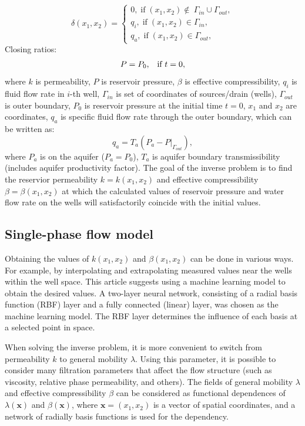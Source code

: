 \documentclass[
11pt,%
tightenlines,%
twoside,%
onecolumn,%
nofloats,%
nobibnotes,%
nofootinbib,%
superscriptaddress,%
noshowpacs,%
centertags]%
{revtex4}
\begin{document}
\begin{equation} \label{bc}
	\delta(x_1,x_2)  = \left\{\begin{array}{crl}
		0, \;\mbox{if}\;(x_1,x_2) \notin\ \Gamma_{in}\cup\Gamma_{out},\\
		q_{i}, \;\mbox{if}\;(x_1,x_2) \in \Gamma_{in},\\
		q_{a}, \;\mbox{if}\;(x_1,x_2) \in \Gamma_{out},
	\end{array}\right. 
\end{equation}
Closing ratios:
\begin{equation} \label{kr}
	P = P_0\mbox{,\quad \mbox{if} $t=0$},
\end{equation}
where $k$ is permeability, $P$ is reservoir pressure, $\beta$ is
effective compressibility, $q_i$ is fluid flow rate in $i$-th well, $\Gamma_{in}$
is set of coordinates of sources/drain (wells), $\Gamma_{out}$ is
outer boundary, $P_0$ is reservoir pressure at the initial time $t=0$, $x_1$ and $x_2$ are coordinates, $q_{a}$ is specific fluid flow rate through the outer boundary, which can be written as:
\begin{equation*} \label{qaq}
	q_{a} = T_{a}(P_{a} - P|_{\Gamma_{out}}),
\end{equation*}
where $P_a$ is on the aquifer ($P_a = P_0$), $T_a$ is
aquifer boundary transmissibility (includes aquifer productivity factor). The goal of the inverse problem is to find the reservior permeability $k = k(x_1,x_2)$ and effective compressibility $\beta = \beta(x_1,x_2)$ at which the calculated values of reservoir pressure and water flow rate on the wells will satisfactorily coincide with the initial values.

\subsection{Single-phase flow model}

Obtaining the values of $k(x_1,x_2)$ and $\beta(x_1,x_2)$ can be done in various ways. For example, by interpolating and extrapolating measured values near the wells within the well space. This article suggests using a machine learning model to obtain the desired values. A two-layer neural network, consisting of a radial basis function (RBF) layer and a fully connected (linear) layer, was chosen as the machine learning model. The RBF layer determines the influence of each basis at a selected point in space.

When solving the inverse problem, it is more convenient to switch from permeability $k$ to general mobility $\lambda$. Using this parameter, it is possible to consider many filtration parameters that affect the flow structure (such as viscosity, relative phase permeability, and others). The fields of general mobility $\lambda$ and effective compressibility $\beta$ can be considered as functional dependences of $\lambda(\mathbf{x})$ and $\beta(\mathbf{x})$, where $\mathbf{x} = (x_1,x_2)$ is a vector of spatial coordinates, and a network of radially basis functions is used for the dependency.
\end{document}
